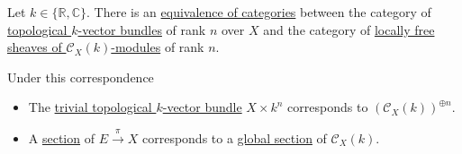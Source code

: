 \documentclass[../../../main]{subfiles}
\begin{document}
\begin{theorem}\label{thm:topological-vector-bundle-is-free-sheaf}
  Let \(k \in \{\mathbb{R}, \mathbb{C}\}\).
  There is an \hyperref[def:equivalent-categories]{equivalence of categories} between the category of \hyperref[def:topological-vector-bundle]{topological \(k\)-vector bundles} of rank \(n\) over \(X\) and the category of \hyperref[def:locally-free-sheaf]{locally free sheaves of \(\mathcal{C}_{X}(k)\)-modules} of rank \(n\).

  Under this correspondence
  \begin{itemize}
    \item The \hyperref[ex:trivial-topological-vector-bundle]{trivial topological \(k\)-vector bundle} \(X \times k^{n}\) corresponds to \((\mathcal{C}_{X}(k))^{\oplus n}\).
    \item A \hyperref[def:section-topological-vector-bundle]{section} of \(E \xrightarrow{\pi} X\) corresponds to a \hyperref[def:global-section-sheaf]{global section} of \(\mathcal{C}_{X}(k)\).
  \end{itemize}
\end{theorem}
\end{document}

